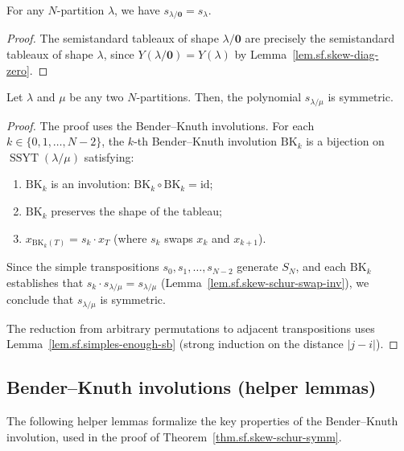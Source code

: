 \begin{lemma}
\label{lem.sf.skew-schur-zero-sb}
\leanhelper
\leanok
For any $N$-partition $\lambda$, we have $s_{\lambda/\mathbf{0}} = s_\lambda$.
\end{lemma}

\begin{proof}
\leanok
The semistandard tableaux of shape $\lambda/\mathbf{0}$ are precisely the
semistandard tableaux of shape $\lambda$, since
$Y(\lambda/\mathbf{0}) = Y(\lambda)$ by Lemma~\ref{lem.sf.skew-diag-zero}.
\end{proof}

\begin{theorem}
\label{thm.sf.skew-schur-symm}
\leantarget
\leanok
Let $\lambda$ and $\mu$ be any two
$N$-partitions. Then, the polynomial $s_{\lambda/\mu}$ is symmetric.
\end{theorem}

\begin{proof}
\leanok
The proof uses the Bender--Knuth involutions. For each
$k \in \{0, 1, \ldots, N{-}2\}$, the $k$-th Bender--Knuth involution
$\mathrm{BK}_k$ is a bijection on $\operatorname{SSYT}(\lambda/\mu)$
satisfying:
\begin{enumerate}
\item $\mathrm{BK}_k$ is an involution: $\mathrm{BK}_k \circ \mathrm{BK}_k = \mathrm{id}$;
\item $\mathrm{BK}_k$ preserves the shape of the tableau;
\item $x_{\mathrm{BK}_k(T)} = s_k \cdot x_T$ (where $s_k$ swaps $x_k$ and $x_{k+1}$).
\end{enumerate}
Since the simple transpositions $s_0, s_1, \ldots, s_{N-2}$ generate $S_N$,
and each $\mathrm{BK}_k$ establishes that $s_k \cdot s_{\lambda/\mu} = s_{\lambda/\mu}$
(Lemma~\ref{lem.sf.skew-schur-swap-inv}),
we conclude that $s_{\lambda/\mu}$ is symmetric.

The reduction from arbitrary permutations to adjacent transpositions
uses Lemma~\ref{lem.sf.simples-enough-sb} (strong induction on the distance $|j - i|$).
\end{proof}

\subsection{Bender--Knuth involutions (helper lemmas)}

The following helper lemmas formalize the key properties of the Bender--Knuth involution,
used in the proof of Theorem~\ref{thm.sf.skew-schur-symm}.

